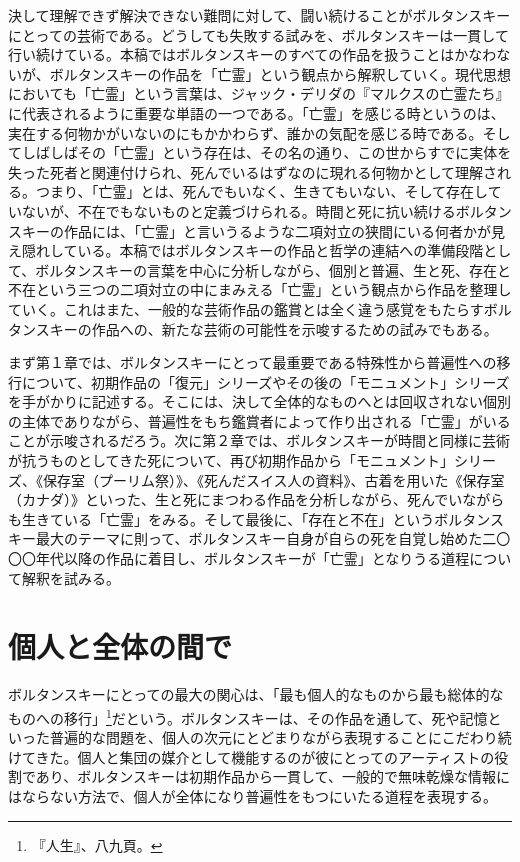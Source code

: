 \documentclass[b5j,twoside,twocolumn]{utarticle}
\begin{document}
決して理解できず解決できない難問に対して、闘い続けることがボルタンスキーにとっての芸術である。どうしても失敗する試みを、ボルタンスキーは一貫して行い続けている。本稿ではボルタンスキーのすべての作品を扱うことはかなわないが、ボルタンスキーの作品を「亡霊」という観点から解釈していく。現代思想においても「亡霊」という言葉は、ジャック・デリダの『マルクスの亡霊たち』に代表されるように重要な単語の一つである。「亡霊」を感じる時というのは、実在する何物かがいないのにもかかわらず、誰かの気配を感じる時である。そしてしばしばその「亡霊」という存在は、その名の通り、この世からすでに実体を失った死者と関連付けられ、死んでいるはずなのに現れる何物かとして理解される。つまり、「亡霊」とは、死んでもいなく、生きてもいない、そして存在していないが、不在でもないものと定義づけられる。時間と死に抗い続けるボルタンスキーの作品には、「亡霊」と言いうるような二項対立の狭間にいる何者かが見え隠れしている。本稿ではボルタンスキーの作品と哲学の連結への準備段階として、ボルタンスキーの言葉を中心に分析しながら、個別と普遍、生と死、存在と不在という三つの二項対立の中にまみえる「亡霊」という観点から作品を整理していく。これはまた、一般的な芸術作品の鑑賞とは全く違う感覚をもたらすボルタンスキーの作品への、新たな芸術の可能性を示唆するための試みでもある。


まず第１章では、ボルタンスキーにとって最重要である特殊性から普遍性への移行について、初期作品の「復元」シリーズやその後の「モニュメント」シリーズを手がかりに記述する。そこには、決して全体的なものへとは回収されない個別の主体でありながら、普遍性をもち鑑賞者によって作り出される「亡霊」がいることが示唆されるだろう。次に第２章では、ボルタンスキーが時間と同様に芸術が抗うものとしてきた死について、再び初期作品から「モニュメント」シリーズ、《保存室（プーリム祭）》、《死んだスイス人の資料》、古着を用いた《保存室（カナダ）》といった、生と死にまつわる作品を分析しながら、死んでいながらも生きている「亡霊」をみる。そして最後に、「存在と不在」というボルタンスキー最大のテーマに則って、ボルタンスキー自身が自らの死を自覚し始めた二〇〇〇年代以降の作品に着目し、ボルタンスキーが「亡霊」となりうる道程について解釈を試みる。


\section{個人と全体の間で}
ボルタンスキーにとっての最大の関心は、「最も個人的なものから最も総体的なものへの移行」\footnote{『人生』、八九頁。}だという。ボルタンスキーは、その作品を通して、死や記憶といった普遍的な問題を、個人の次元にとどまりながら表現することにこだわり続けてきた。個人と集団の媒介として機能するのが彼にとってのアーティストの役割であり、ボルタンスキーは初期作品から一貫して、一般的で無味乾燥な情報にはならない方法で、個人が全体になり普遍性をもつにいたる道程を表現する。
\end{document}
